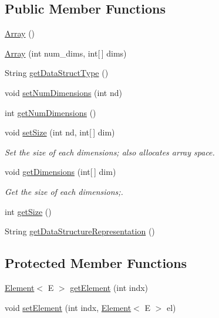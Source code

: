 \subsection*{Public Member Functions}
\begin{DoxyCompactItemize}
\item 
\hyperlink{classbridges_1_1base_1_1_array_ad5dbf7bbd9811c2dac16a5c135465d4b}{Array} ()
\item 
\hyperlink{classbridges_1_1base_1_1_array_ab37dbe6efe0c34242456971e430763f7}{Array} (int num\+\_\+dims, int\mbox{[}$\,$\mbox{]} dims)
\item 
String \hyperlink{classbridges_1_1base_1_1_array_ad138b9787d46d053d6bd324b344be9a6}{get\+Data\+Struct\+Type} ()
\item 
void \hyperlink{classbridges_1_1base_1_1_array_ab7859668a25d16adfdb308e24c7d44c6}{set\+Num\+Dimensions} (int nd)
\item 
int \hyperlink{classbridges_1_1base_1_1_array_a808da9a62df3f0e7a905ec895a82087a}{get\+Num\+Dimensions} ()
\item 
void \hyperlink{classbridges_1_1base_1_1_array_aa357b6b957eeedfdb5acc9d653d7260f}{set\+Size} (int nd, int\mbox{[}$\,$\mbox{]} dim)
\begin{DoxyCompactList}\small\item\em Set the size of each dimensions; also allocates array space. \end{DoxyCompactList}\item 
void \hyperlink{classbridges_1_1base_1_1_array_af7aa7f3f18989af5f48a2b69cb7fb07d}{get\+Dimensions} (int\mbox{[}$\,$\mbox{]} dim)
\begin{DoxyCompactList}\small\item\em Get the size of each dimensions;. \end{DoxyCompactList}\item 
int \hyperlink{classbridges_1_1base_1_1_array_a49a3a4ea72c8315f1f14eed25071d18a}{get\+Size} ()
\item 
String \hyperlink{classbridges_1_1base_1_1_array_a111592e8b75202064bdf06d9c2234d74}{get\+Data\+Structure\+Representation} ()
\end{DoxyCompactItemize}
\subsection*{Protected Member Functions}
\begin{DoxyCompactItemize}
\item 
\hyperlink{classbridges_1_1base_1_1_element}{Element}$<$ E $>$ \hyperlink{classbridges_1_1base_1_1_array_a0e690cbe2606e44cce99b56802b63e0e}{get\+Element} (int indx)
\item 
void \hyperlink{classbridges_1_1base_1_1_array_aafde1304d602e8b0f673dd61bc00c18f}{set\+Element} (int indx, \hyperlink{classbridges_1_1base_1_1_element}{Element}$<$ E $>$ el)
\end{DoxyCompactItemize}
